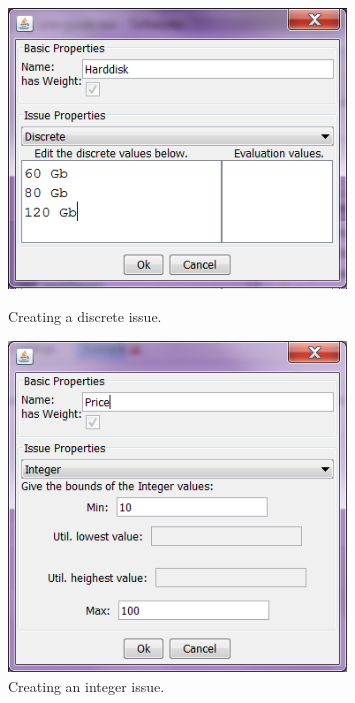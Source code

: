 \documentclass[]{article}
\begin{document}
\begin{figure}[ht]
\begin{minipage}[b]{0.45\linewidth}
\centering
	\includegraphics[width=0.8\textwidth]{media/image7a.png}
\caption{Creating a discrete issue.}
\label{fig:createIssueD}
\end{minipage}
\hspace{0.5cm}
\begin{minipage}[b]{0.45\linewidth}
\centering
	\includegraphics[width=0.8\textwidth]{media/image7b.png}
\caption{Creating an integer issue.}\label{Fig:createIssueI}
\end{minipage}
\end{figure}
\end{document}
